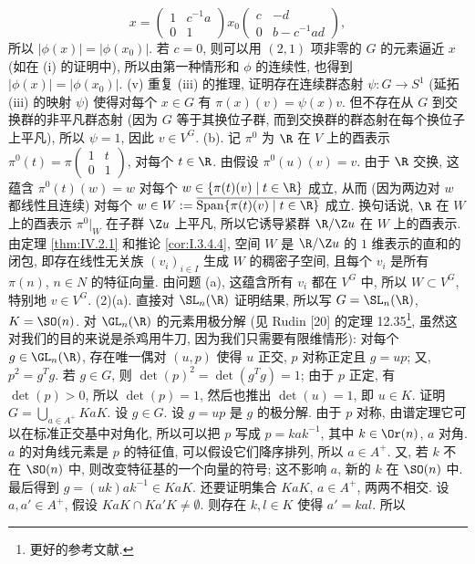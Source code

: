 \begin{solution}
\[
x = \begin{pmatrix} 1 & c^{-1}a \\ 0 & 1 \end{pmatrix}x_0\begin{pmatrix} c & -d \\ 0 & b - c^{-1}ad \end{pmatrix},
\]
所以 $|\phi(x)| = |\phi(x_0)|$. 若 $c = 0$, 则可以用 $(2,1)$ 项非零的 $G$ 的元素逼近 $x$ (如在 (i) 的证明中), 所以由第一种情形和 $\phi$ 的连续性, 也得到 $|\phi(x)| = |\phi(x_0)|$.
(v) 重复 (iii) 的推理, 证明存在连续群态射 $\psi \colon G \to S^1$ (延拓 (iii) 的映射 $\psi$) 使得对每个 $x \in G$ 有 $\pi(x)(v) = \psi(x)v$. 但不存在从 $G$ 到交换群的非平凡群态射 (因为 $G$ 等于其换位子群, 而到交换群的群态射在每个换位子上平凡), 所以 $\psi = 1$, 因此 $v \in V^G$.
(b). 记 $\pi^0$ 为 $\R$ 在 $V$ 上的酉表示 $\pi^0(t) = \pi\begin{pmatrix} 1 & t \\ 0 & 1 \end{pmatrix}$, 对每个 $t \in \R$. 由假设 $\pi^0(u)(v) = v$. 由于 $\R$ 交换, 这蕴含 $\pi^0(t)(w) = w$ 对每个 $w \in \{\pi(t)(v) \mid t \in \R\}$ 成立, 从而 (因为两边对 $w$ 都线性且连续) 对每个 $w \in W := \overline{\operatorname{Span}\{\pi(t)(v) \mid t \in \R\}}$ 成立. 换句话说, $\R$ 在 $W$ 上的酉表示 $\pi^0|_W$ 在子群 $\Z u$ 上平凡, 所以它诱导紧群 $\R/\Z u$ 在 $W$ 上的酉表示. 由定理 \ref{thm:IV.2.1} 和推论 \ref{cor:I.3.4.4}, 空间 $W$ 是 $\R/\Z u$ 的 $1$ 维表示的直和的闭包, 即存在线性无关族 $(v_i)_{i \in I}$ 生成 $W$ 的稠密子空间, 且每个 $v_i$ 是所有 $\pi(n)$, $n \in N$ 的特征向量. 由问题 (a), 这蕴含所有 $v_i$ 都在 $V^G$ 中, 所以 $W \subset V^G$, 特别地 $v \in V^G$.
(2)(a). 直接对 $\SL_n(\R)$ 证明结果, 所以写 $G = \SL_n(\R)$, $K = \SO(n)$.
对 $\GL_n(\R)$ 的元素用极分解 (见 Rudin {[}20{]} 的定理 12.35\footnote{更好的参考文献.}, 虽然这对我们的目的来说是杀鸡用牛刀, 因为我们只需要有限维情形): 对每个 $g \in \GL_n(\R)$, 存在唯一偶对 $(u, p)$ 使得 $u$ 正交, $p$ 对称正定且 $g = up$; 又, $p^2 = g^Tg$. 若 $g \in G$, 则 $\det(p)^2 = \det(g^Tg) = 1$; 由于 $p$ 正定, 有 $\det(p) > 0$, 所以 $\det(p) = 1$, 然后也推出 $\det(u) = 1$, 即 $u \in K$.
证明 $G = \bigcup_{a \in A^+}KaK$. 设 $g \in G$. 设 $g = up$ 是 $g$ 的极分解. 由于 $p$ 对称, 由谱定理它可以在标准正交基中对角化, 所以可以把 $p$ 写成 $p = kak^{-1}$, 其中 $k \in \Or(n)$, $a$ 对角. $a$ 的对角线元素是 $p$ 的特征值, 可以假设它们降序排列, 所以 $a \in A^+$. 又, 若 $k$ 不在 $\SO(n)$ 中, 则改变特征基的一个向量的符号; 这不影响 $a$, 新的 $k$ 在 $\SO(n)$ 中. 最后得到 $g = (uk)ak^{-1} \in KaK$.
还要证明集合 $KaK$, $a \in A^+$, 两两不相交. 设 $a, a' \in A^+$, 假设 $KaK \cap Ka'K \neq \emptyset$. 则存在 $k, l \in K$ 使得 $a' = kal$. 所以

\end{solution}
